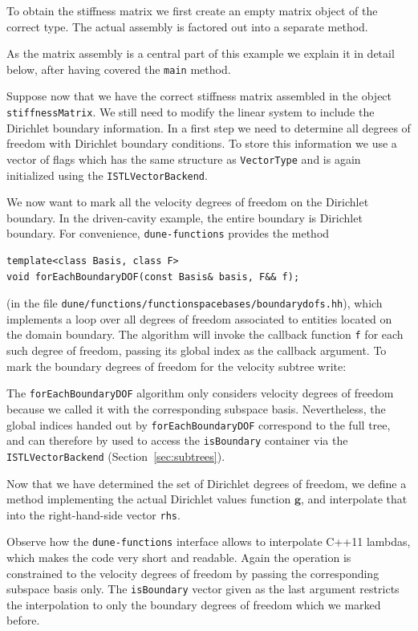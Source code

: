 \documentclass[a4paper,10pt,headings=normal,bibliography=totoc]{scrartcl}
\newcommand{\cpp}[1]{\lstinline[basicstyle=\ttfamily]!#1!}
\newcommand{\dunemodule}[1]{\texttt{#1}}
\newcommand{\file}[1]{\texttt{#1}}
\begin{document}
To obtain the stiffness matrix we first create an empty matrix object of the correct type.  The actual assembly
is factored out into a separate method.
%

%
As the matrix assembly is a central part of this example we explain it in detail below, after having covered the \cpp{main} method.

Suppose now that we have the correct stiffness matrix assembled in the object \cpp{stiffnessMatrix}.  We still need
to modify the linear system to include the Dirichlet boundary information.
In a first step we need to determine all degrees of freedom with Dirichlet boundary conditions.
To store this information we use a vector of flags which has the same structure
as \cpp{VectorType} and is again initialized using the \cpp{ISTLVectorBackend}.
%

%
We now want to mark all the velocity degrees of freedom on the Dirichlet boundary.
In the driven-cavity example, the entire boundary is Dirichlet boundary.
For convenience, \dunemodule{dune-functions} provides the method
\begin{lstlisting}[style=Interface]
template<class Basis, class F>
void forEachBoundaryDOF(const Basis& basis, F&& f);
\end{lstlisting}
(in the file \file{dune/functions/functionspacebases/boundarydofs.hh}),
which implements a loop over all degrees of freedom associated to entities located
on the domain boundary. The algorithm will invoke the callback function \cpp{f}
for each such degree of freedom, passing its global index as the callback argument.
To mark the boundary degrees of freedom for the velocity subtree write:
%

%
The \cpp{forEachBoundaryDOF} algorithm only considers velocity
degrees of freedom because we called it with the corresponding subspace basis.
Nevertheless, the global indices handed out by \cpp{forEachBoundaryDOF} correspond
to the full tree, and can therefore by used to access the \cpp{isBoundary}
container via the \cpp{ISTLVectorBackend} (Section~\ref{sec:subtrees}).

Now that we have determined the set of Dirichlet degrees of freedom,
we define a method implementing the actual Dirichlet values function $\mathbf{g}$, and interpolate
that into the right-hand-side vector \cpp{rhs}.
%

%
Observe how the \dunemodule{dune-functions} interface allows to interpolate C++11 lambdas, which makes the code
very short and readable. Again the operation is constrained to the velocity degrees of freedom
by passing the corresponding subspace basis only.
The \cpp{isBoundary} vector given as the last argument restricts the interpolation
to only the boundary degrees of freedom which we marked before.
\end{document}
